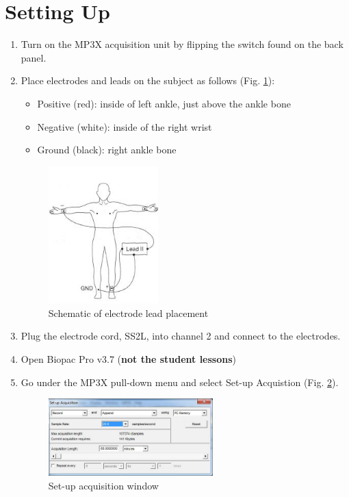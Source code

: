 \documentclass{article}
\begin{document}
\section*{Setting Up}
\begin{enumerate}
	\item Turn on the MP3X acquisition unit by flipping the switch found on the back panel.
	\item Place electrodes and leads on the subject as follows (Fig. \ref{ecg}):\begin{itemize}
		\item Positive (red): inside of left ankle, just above the ankle bone
		\item Negative (white): inside of the right wrist
		\item Ground (black): right ankle bone
	\end{itemize}
	\begin{figure}[h]
	\centering\includegraphics[width=0.4\textwidth]{../images/ECG_I_3.jpg}
	\caption{Schematic of electrode lead placement}
	\label{ecg}
	\end{figure}
	
	\item Plug the electrode cord, SS2L, into channel 2 and connect to the electrodes.
	\item Open Biopac Pro v3.7 (\textbf{not the student lessons})
	\item Go under the MP3X pull-down menu and select Set-up Acquistion (Fig. \ref{setup}).
	\begin{figure}[h]
	\centering\includegraphics[width=0.6\textwidth]{../images/ECG_I_4.jpg}
	\caption{Set-up acquisition window}
	\label{setup}
	\end{figure}
	

\end{enumerate}
\end{document}
